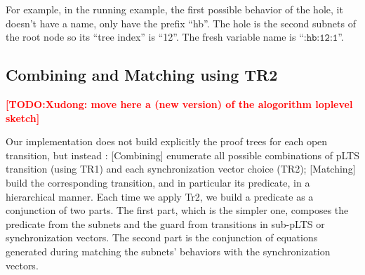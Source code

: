 \documentclass{lncs/llncs}
\newcommand{\TODO}[1]{\textcolor{red}{\textbf{[TODO:#1]}}}
\newcommand{\OTvar}{\texttt}
\begin{document}
For example, in the running example, the first possible behavior of
the hole, it doesn't have a name, only have the prefix ``hb''. The
hole is the second subnets of the root node so its ``tree index'' is
``12''. The fresh variable name is ``$\OTvar{:hb:12:1}$''. 



\subsection{Combining and Matching using TR2}
\TODO{Xudong: move here a (new version) of the alogorithm loplevel sketch}

Our implementation does not build explicitly the proof trees for each
open transition, but instead : [Combining] enumerate all possible combinations of
pLTS transition (using TR1) and each synchronization vector choice
(TR2); [Matching] build the corresponding transition, and in particular
its predicate, in a hierarchical manner.
Each time we apply Tr2, we build a predicate as a conjunction of two
parts. The first part, which is the simpler one, composes the
predicate from the 
subnets and the guard from transitions in sub-pLTS or synchronization
vectors. The second part is the conjunction of equations generated
during matching the subnets' behaviors with the synchronization
vectors. 

 
\end{document}
